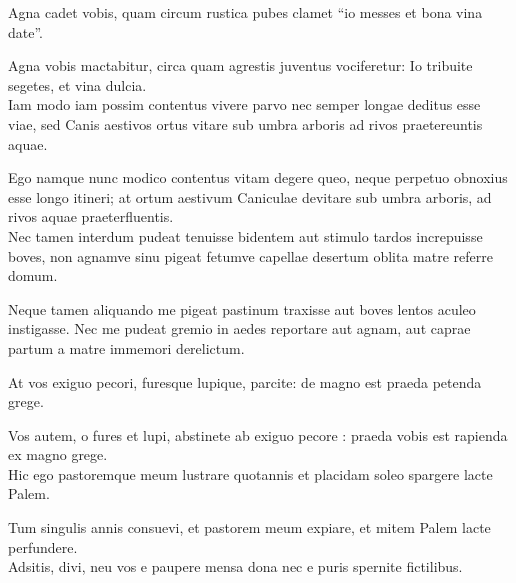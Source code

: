 {\large
\noindent Agna cadet vobis, quam circum rustica pubes clamet ``io messes et bona vina date''.\\

}

\noindent Agna vobis mactabitur, circa quam agrestis juventus vociferetur: Io tribuite segetes, et vina dulcia. \\

{\large
\noindent Iam modo iam possim contentus vivere parvo nec semper longae deditus esse viae, sed Canis aestivos ortus vitare sub umbra arboris ad rivos praetereuntis aquae.\\

}

\noindent Ego namque nunc modico contentus vitam degere queo, neque perpetuo obnoxius esse longo itineri; at ortum aestivum Caniculae devitare sub umbra arboris, ad rivos aquae praeterfluentis. \\

{\large
\noindent Nec tamen interdum pudeat tenuisse bidentem aut stimulo tardos increpuisse boves, non agnamve sinu pigeat fetumve capellae desertum oblita matre referre domum.\\

}


\noindent Neque tamen aliquando me pigeat pastinum traxisse aut boves lentos aculeo instigasse. Nec me pudeat gremio in aedes reportare aut agnam, aut caprae partum a matre immemori derelictum.\\ 

\newpage

{\large
\noindent At vos exiguo pecori, furesque lupique, parcite: de magno est praeda petenda grege.\\

}

\noindent Vos autem, o fures et lupi, abstinete ab exiguo pecore : praeda vobis est rapienda ex magno grege. \\

{\large
\noindent Hic ego pastoremque meum lustrare quotannis et placidam soleo spargere lacte Palem.\\

}

\noindent Tum singulis annis consuevi, et pastorem meum expiare, et mitem Palem lacte perfundere. \\

{\large
\noindent Adsitis, divi, neu vos e paupere mensa dona nec e puris spernite fictilibus.\\

}

